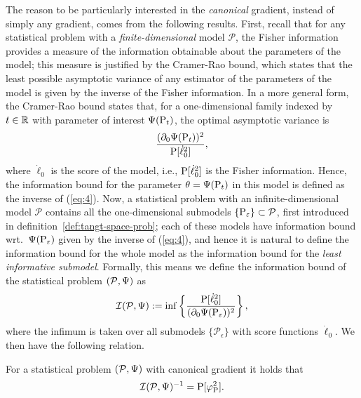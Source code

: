 \documentclass[a4,danish]{article}
\begin{document}
The reason to be particularly interested in the \textit{canonical} gradient, instead of simply any
gradient, comes from the following results. First, recall that for any statistical problem with a
\textit{finite-dimensional} model $\mathcal{P}$, the Fisher information provides a measure of the
information obtainable about the parameters of the model; this measure is justified by the
Cramer-Rao bound, which states that the least possible asymptotic variance of any estimator of the
parameters of the model is given by the inverse of the Fisher information. In a more general form,
the Cramer-Rao bound states that, for a one-dimensional family indexed by $t \in \R$ with parameter
of interest $\TT(\P_t)$, the optimal asymptotic variance is
\begin{equation}
  \label{eq:4}
  \frac{(\partial_{0}{\TT(\P_t)})^2}{\P[\dot{\ell}_0^2]},
\end{equation}
where $\dot{\ell}_0$ is the score of the model, i.e., 
$\P[\dot{\ell}_0^2]$ is the Fisher information. Hence, the information
bound for the parameter $\theta= \TT(\P_t)$ in this model is defined
as the inverse of (\ref{eq:4}). Now, a statistical problem with an
infinite-dimensional model $\mathcal{P}$ contains all the
one-dimensional submodels $\{\P_{\epsilon}\} \subset \mathcal{P}$,
first introduced in definition~\ref{def:tangt-space-prob}; each of
these models have information bound wrt.\ $\TT(\P_{\epsilon})$ given
by the inverse of (\ref{eq:4}), and hence it is natural to define the
information bound for the whole model as the information bound for the
\textit{least informative submodel}. Formally, this means we define
the information bound of the statistical problem $(\mathcal{P}, \TT)$
as
\begin{equation*}
  \mathcal{I}(\mathcal{P}, \TT)  := \inf
  \left\{
    \frac{\P[\dot{\ell}_0^2]}{(\partial_{0}{\TT(\P_{\epsilon})})^2}
  \right\},
\end{equation*}
where the infimum is taken over all submodels $\{\mathcal{P}_{\epsilon}\}$ with score functions
$\dot{\ell}_0$. We then have the following relation. 
\begin{proposition}
  \label{prop:cr}
  For a statistical problem $(\mathcal{P}, \TT)$ with canonical gradient  it holds that
  \begin{equation*}
    \mathcal{I}(\mathcal{P}, \TT)^{-1} = 
    \P[\phi_{\P}^2].
  \end{equation*}
\end{proposition}
\end{document}
